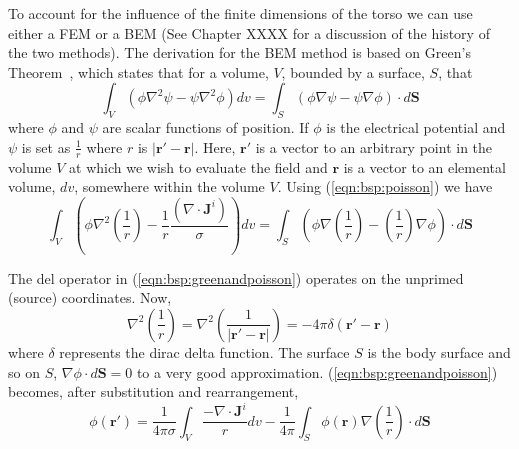 To account for the influence of the finite dimensions of the torso we can use
either a FEM or a BEM (See Chapter XXXX for a discussion
of the history of the two methods).
The derivation for the BEM method is based on Green's
Theorem~\cite{Barr1966,Gulrajani1989,Clayton2002},
which states that for a volume, $V$, bounded by a surface, $S$, that
\begin{equation}
\label{eqn:bsp:green}
\int_{V} \left(\phi \nabla^{2}\psi - \psi \nabla^{2}\phi  \right) dv =
\int_{S} \left( \phi \nabla \psi - \psi \nabla \phi \right) \cdot d\mathbf{S}
\end{equation}
where $\phi$ and $\psi$ are scalar functions of position.
If $\phi$ is the electrical potential and $\psi$ is set as $\frac{1}{r}$ where
$r$ is $|\mathbf{r'}-\mathbf{r}|$.
Here, $\mathbf{r'}$ is a vector to an arbitrary point in the volume $V$ at which
we wish to evaluate the field and $\mathbf{r}$ is a vector to an elemental
volume, $dv$, somewhere within the volume $V$.
Using (\ref{eqn:bsp:poisson}) we have
\begin{equation}
\label{eqn:bsp:greenandpoisson}
\int_{V}
    \left(
        \phi \nabla^{2}\left(\frac{1}{r}\right) -
        \frac{1}{r} \frac{\left(\nabla \cdot \mathbf{J}^{i} \right)}{\sigma}
    \right)
dv =
\int_{S}
    \left(
        \phi \nabla \left(\frac{1}{r}\right) -
        \left(\frac{1}{r}\right) \nabla \phi
    \right)
\cdot d\mathbf{S}
\end{equation}

The del operator in (\ref{eqn:bsp:greenandpoisson}) operates on the unprimed (source) coordinates.
Now,
\begin{equation}
\label{eqn:bsp:oneoverr}
\nabla^{2}\left(\frac{1}{r}\right) =
\nabla^{2}\left(\frac{1}{|\mathbf{r'}-\mathbf{r}|}\right) =
-4\pi\delta\left(\mathbf{r'}-\mathbf{r}\right)
\end{equation}
where $\delta$ represents the dirac delta function.  The surface $S$ is the body
surface and so on $S$, $\nabla\phi \cdot d\mathbf{S} = 0$ to a very good
approximation.  (\ref{eqn:bsp:greenandpoisson}) becomes, after substitution and
rearrangement,
\begin{equation}
\label{eqn:bsp:substituted}
\phi\left(\mathbf{r'}\right) =
\frac{1}{4 \pi \sigma}\int_{V} \frac{-\nabla \cdot \mathbf{J}^{i}}{r}dv - 
\frac{1}{4 \pi}\int_{S} \phi\left(\mathbf{r}\right)
\nabla\left(\frac{1}{r}\right) \cdot d\mathbf{S}
\end{equation}

